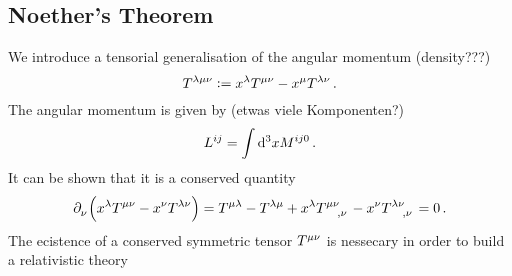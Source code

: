 \subsection{Noether's Theorem}
We introduce a tensorial generalisation of the angular momentum (density???)
\begin{equation}
    \tensor{T}{^\lambda^\mu^\nu}:=
    \tensor{x}{^\lambda}\tensor{T}{^\mu^\nu}-\tensor{x}{^\mu}\tensor{T}{^\lambda^\nu}\,
    .
\end{equation}
The angular momentum is given by (etwas viele Komponenten?)
\begin{equation}
    \tensor{L}{^i^j} = \int\dif{}^3 x \tensor{M}{^i^j^0}\, .
\end{equation}
It can be shown that it is a conserved quantity
\begin{equation}
    \tensor{\partial}{_\nu}\left(\tensor{x}{^\lambda}\tensor{T}{^\mu^\nu}-\tensor{x}{^\nu}\tensor{T}{^\lambda^\nu}\right)
    =\tensor{T}{^\mu^\lambda}-\tensor{T}{^\lambda^\mu}+\tensor{x}{^\lambda}
    \tensor{T}{^\mu^\nu_,_\nu}-\tensor{x}{^\nu}\tensor{T}{^\lambda^\nu_,_\nu}=0\, .
\end{equation}
The ecistence of a conserved symmetric tensor $\tensor{T}{^\mu^\nu}$ is
nessecary in order to build a relativistic theory
